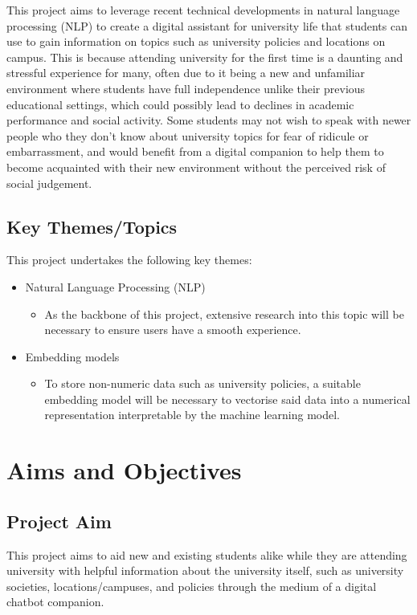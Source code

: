 \documentclass[12pt]{report}
\begin{document}
    \noindent This project aims to leverage recent technical developments in natural language processing (NLP)
    to create a digital assistant for university life that students can use to gain information on topics
    such as university policies and locations on campus. This is because attending university for the first time
    is a daunting and stressful experience for many, often due to it being a new and unfamiliar environment 
    where students have full independence unlike their previous educational settings, which could possibly 
    lead to declines in academic performance and social activity. Some students may not 
    wish to speak with newer people who they don't know about university topics for fear of 
    ridicule or embarrassment, and would benefit from a digital companion to help them to become 
    acquainted with their new environment without the perceived risk of social judgement.

    

    \section{Key Themes/Topics}
    This project undertakes the following key themes:

    \begin{itemize}
        \item Natural Language Processing (NLP) 
            \begin{itemize}
                \item As the backbone of this project, extensive research into this topic will be necessary 
                to ensure users have a smooth experience.
            \end{itemize}
        \item Embedding models
            \begin{itemize}
                \item To store non-numeric data such as university policies, a suitable embedding model
                will be necessary to vectorise said data into a numerical representation interpretable by
                the machine learning model.
            \end{itemize}
    \end{itemize}

    \chapter{Aims and Objectives}
    \section{Project Aim}
    This project aims to aid new and existing students alike while they are attending university with 
    helpful information about the university itself, such as university societies, locations/campuses, 
    and policies through the medium of a digital chatbot companion.
\end{document}
